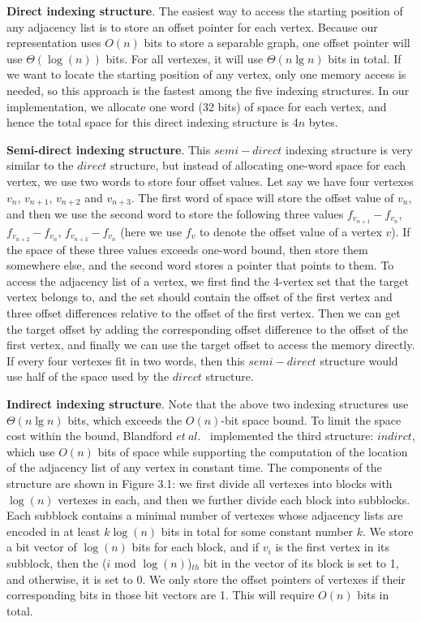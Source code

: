 \documentclass[12pt,glossary]{dalthesis}
\begin{document}
\bigskip
\bigskip

\textbf{Direct indexing structure}. The easiest way to access the starting position of 
any adjacency list is to store an offset pointer for each vertex. Because our representation uses $O(n)$ bits to store a separable graph, one offset pointer will use $\Theta (\log (n))$ bits. For all vertexes, it will use $ \Theta (n\lg n)$ bits in total. If we want to locate the starting position of any vertex, only one memory access is needed, so this approach is the fastest among the five indexing structures. In our implementation, we allocate one word (32 bits) of space for each vertex, and hence the total space for this direct indexing structure is 4$n$ bytes.

\bigskip
\bigskip

\textbf{Semi-direct indexing structure}. This $semi-direct$ indexing structure is very similar to the $direct$ structure, but instead of allocating one-word space for each vertex, we use two words to store four offset values. Let say we have four vertexes $v_{n}$, $v_{n+1}$, $v_{n+2}$ and $v_{n+3}$. The first word of space will store the offset value of $v_{n}$, and then we use the second word to store the following three values $f_{v_{n+1}}-f_{v_{n}}$, $f_{v_{n+2}}-f_{v_{n}}$, $f_{v_{n+3}}-f_{v_{n}}$ (here we use $f_{v}$ to denote the offset value of a vertex $v$). If the space of these three values exceeds one-word bound, then store them somewhere else, and the second word stores a pointer that points to them. To access the adjacency list of a vertex, we first find the 4-vertex set that the target vertex belongs to, and the set should contain the offset of the first vertex and three offset differences relative to the offset of the first vertex. Then we can get the target offset by adding the corresponding offset difference to the offset of the first vertex, and finally we can use the target offset to access the memory directly. If every four vertexes fit in two words, then this $semi-direct$ structure would use half of the space used by the $direct$ structure.     

\bigskip
\bigskip

\textbf{Indirect indexing structure}. Note that the above two indexing structures use $ \Theta (n\lg n)$ bits, which exceeds the $O(n)$-bit space bound. To limit the space cost within the bound, Blandford $et \ al.$~\cite{compact-representation} implemented the third structure: $indirct$, which use $O(n)$ bits of space while supporting the computation of the location of the adjacency list of any vertex in constant time. The components of the structure are shown in  Figure 3.1: we first divide all vertexes into blocks with $\log(n)$ vertexes in each, and then we further divide each block into subblocks. Each subblock contains a minimal number of vertexes whose adjacency lists are encoded in at least $k\log(n)$ bits in total for some constant number $k$. We store a bit vector of $\log(n)$ bits for each block, and if $v_{i}$ is the first vertex in its subblock, then the ($i$ mod $\log (n)$)$_{th}$ bit in the vector of its block is set to 1, and otherwise, it is set to 0. We only store the offset pointers of vertexes if their corresponding bits in those bit vectors are 1. This will require $O(n)$ bits in total. 
\end{document}
